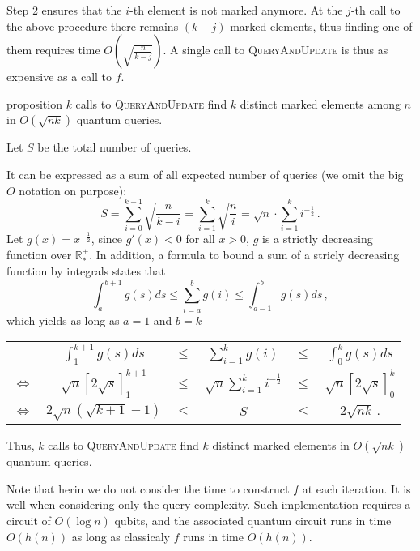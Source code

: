 Step 2 ensures that the $i$-th element is not marked anymore. At the $j$-th call
to the above procedure there remains $(k - j)$ marked elements, thus finding one
of them requires time $O(\sqrt{\frac{n}{k-j}})$. A single call to
\textsc{QueryAndUpdate} is thus as expensive as a call to $f$.


\begin{theoremEnd}{proposition}\label{prop:quantum-queries-grover}
    $k$ calls to \textsc{QueryAndUpdate} find $k$ distinct marked elements
    among $n$ in $O(\sqrt{nk})$ quantum queries.
\end{theoremEnd}\label{prop:k-call-qandu}
\begin{proofEnd}

Let $S$ be the total number of queries.

It can be expressed as a sum of all expected number of queries (we omit the big
$O$ notation on purpose):
\begin{equation*}
  S = \sum_{i = 0}^{k-1} \sqrt{\frac{n}{k-i}}
    = \sum_{i = 1}^{k} \sqrt{\frac{n}{i}}
    = \sqrt n \cdot \sum_{i = 1}^{k} i^{-\frac{1}{2}} \, .
\end{equation*}
Let $g(x) = x^{-\frac{1}{2}}$, since $g'(x) < 0 $ for all $x > 0$, $g$ is a
strictly decreasing function over $\mathbb R^+_*$. In addition, a formula to
bound a sum of a stricly decreasing function by integrals states that
\begin{equation*}
    \int_{a}^{b+1} g(s)ds \leq \sum_{i = a}^{b} g(i) \leq \int_{a-1}^{b} g(s)ds \, ,
\end{equation*}
which yields as long as $a = 1$ and $b = k$

\begin{table}[H]
    \setlength\tabcolsep{1.5pt}
    \centering
    \begin{tabular}{lccccc}
                      & $ \displaystyle\int_{1}^{k+1} g(s)ds $ & $\leq$ & $\displaystyle \sum_{i = 1}^{k} g(i)$ & $\leq$ & $\displaystyle \int_{0}^{k} g(s)ds$ \\
    $\Leftrightarrow$ & $\displaystyle \sqrt n \left[ 2 \sqrt s \right]_1^{k+1}$ & $\leq$ & $\sqrt n \displaystyle\sum_{i = 1}^{k} i^{-\frac{1}{2}}$ & $\leq$ & $\sqrt n \displaystyle \left[ 2 \sqrt s \right]_0^{k}$ \\
    $\Leftrightarrow$ & $\displaystyle 2 \sqrt n (\sqrt{k+1} - 1)$ & $\leq$ & $S$ & $\leq$ & $2 \sqrt{nk} \, .$
    \end{tabular}
\end{table}

Thus, $k$ calls to \textsc{QueryAndUpdate} find $k$ distinct marked
elements in $O(\sqrt{nk})$ quantum queries.

Note that herin we do not consider the time to construct $f$ at each iteration.
It is well when considering only the query complexity. Such implementation
requires a circuit of $O(\log n)$ qubits, and the associated quantum circuit
runs in time $O(h(n))$ as long as classicaly $f$ runs in time $O(h(n))$.
\end{proofEnd}
